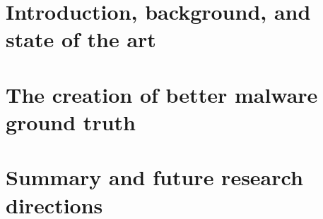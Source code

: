 \mainmatter{}

\part{Introduction, background, and state of the art}




\part{The creation of better malware ground truth}




\part{Summary and future research directions}

